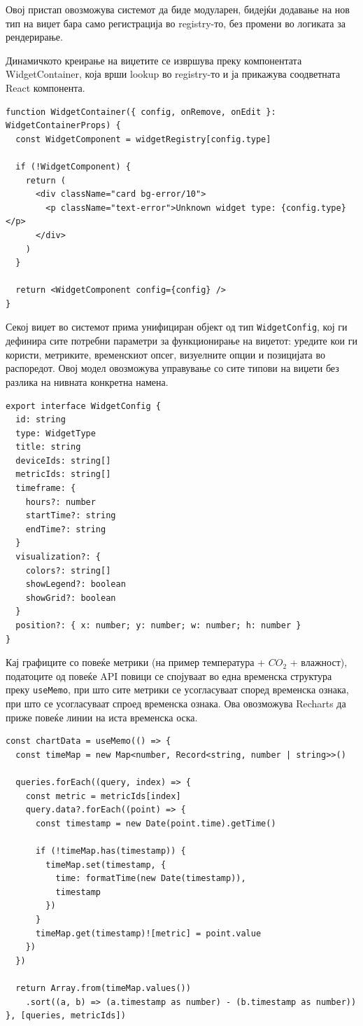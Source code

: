 Овој пристап овозможува системот да биде модуларен, бидејќи додавање на нов тип на виџет бара само регистрација во registry-то, без промени во логиката за рендерирање.

Динамичкото креирање на виџетите се извршува преку компонентата WidgetContainer, која врши lookup во registry-то и ја прикажува соодветната React компонента.

\begin{verbatim}
function WidgetContainer({ config, onRemove, onEdit }: WidgetContainerProps) {
  const WidgetComponent = widgetRegistry[config.type]

  if (!WidgetComponent) {
    return (
      <div className="card bg-error/10">
        <p className="text-error">Unknown widget type: {config.type}</p>
      </div>
    )
  }

  return <WidgetComponent config={config} />
}
\end{verbatim}

Секој виџет во системот прима унифициран објект од тип \texttt{WidgetConfig}, кој ги дефинира сите потребни параметри за функционирање на виџетот: уредите кои ги користи, метриките, временскиот опсег, визуелните опции и позицијата во распоредот. Овој модел овозможува управување со сите типови на виџети без разлика на нивната конкретна намена.

\begin{verbatim}
export interface WidgetConfig {
  id: string
  type: WidgetType
  title: string
  deviceIds: string[]
  metricIds: string[]
  timeframe: {
    hours?: number
    startTime?: string
    endTime?: string
  }
  visualization?: {
    colors?: string[]
    showLegend?: boolean
    showGrid?: boolean
  }
  position?: { x: number; y: number; w: number; h: number }
}
\end{verbatim}

Кај графиците со повеќе метрики (на пример температура + $CO_2$ + влажност), податоците
од повеќе API повици се спојуваат во една временска структура преку \texttt{useMemo}, при што сите метрики се усогласуваат според временска ознака, при што се усогласуваат спроед временска ознака. Ова овозможува Recharts да приже повеќе линии на иста временска оска.

\begin{verbatim}
const chartData = useMemo(() => {
  const timeMap = new Map<number, Record<string, number | string>>()

  queries.forEach((query, index) => {
    const metric = metricIds[index]
    query.data?.forEach((point) => {
      const timestamp = new Date(point.time).getTime()
      
      if (!timeMap.has(timestamp)) {
        timeMap.set(timestamp, { 
          time: formatTime(new Date(timestamp)),
          timestamp 
        })
      }
      timeMap.get(timestamp)![metric] = point.value
    })
  })

  return Array.from(timeMap.values())
    .sort((a, b) => (a.timestamp as number) - (b.timestamp as number))
}, [queries, metricIds])
\end{verbatim}

